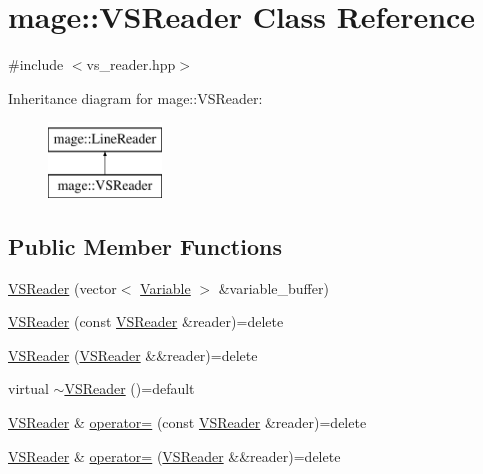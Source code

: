 \hypertarget{classmage_1_1_v_s_reader}{}\section{mage\+:\+:V\+S\+Reader Class Reference}
\label{classmage_1_1_v_s_reader}


{\ttfamily \#include $<$vs\+\_\+reader.\+hpp$>$}

Inheritance diagram for mage\+:\+:V\+S\+Reader\+:\begin{figure}[H]
\begin{center}
\leavevmode
\includegraphics[height=2.000000cm]{classmage_1_1_v_s_reader}
\end{center}
\end{figure}
\subsection*{Public Member Functions}
\begin{DoxyCompactItemize}
\item 
\hyperlink{classmage_1_1_v_s_reader_ab41fb08f6e7a72b0ba7059ecb8c91623}{V\+S\+Reader} (vector$<$ \hyperlink{structmage_1_1_variable}{Variable} $>$ \&variable\+\_\+buffer)
\item 
\hyperlink{classmage_1_1_v_s_reader_aec7ec2ea03d5d77c5e78438a60263a73}{V\+S\+Reader} (const \hyperlink{classmage_1_1_v_s_reader}{V\+S\+Reader} \&reader)=delete
\item 
\hyperlink{classmage_1_1_v_s_reader_a84ba10ef4d308d94ea947155ab72d82a}{V\+S\+Reader} (\hyperlink{classmage_1_1_v_s_reader}{V\+S\+Reader} \&\&reader)=delete
\item 
virtual \hyperlink{classmage_1_1_v_s_reader_adb1dc76d802501476f1af285fe22369d}{$\sim$\+V\+S\+Reader} ()=default
\item 
\hyperlink{classmage_1_1_v_s_reader}{V\+S\+Reader} \& \hyperlink{classmage_1_1_v_s_reader_ab7d85956947e6b2a28650498573bc055}{operator=} (const \hyperlink{classmage_1_1_v_s_reader}{V\+S\+Reader} \&reader)=delete
\item 
\hyperlink{classmage_1_1_v_s_reader}{V\+S\+Reader} \& \hyperlink{classmage_1_1_v_s_reader_a2be1e0645e3496f71c2f2b7fcf98ba2a}{operator=} (\hyperlink{classmage_1_1_v_s_reader}{V\+S\+Reader} \&\&reader)=delete
\end{DoxyCompactItemize}
